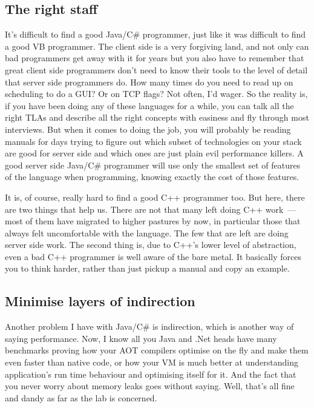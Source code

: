 \documentclass{book}
\begin{document}
\subsection{The right staff}

It's difficult to find a good Java/C\# programmer, just like it was
difficult to find a good VB programmer. The client side is a very
forgiving land, and not only can bad programmers get away with it for
years but you also have to remember that great client side programmers
don't need to know their tools to the level of detail that server side
programmers do. How many times do you need to read up on scheduling to
do a GUI? Or on TCP flags? Not often, I'd wager. So the reality is, if
you have been doing any of these languages for a while, you can talk
all the right TLAs and describe all the right concepts with easiness
and fly through most interviews. But when it comes to doing the job,
you will probably be reading manuals for days trying to figure out
which subset of technologies on your stack are good for server side
and which ones are just plain evil performance killers. A good server
side Java/C\# programmer will use only the smallest set of features of
the language when programming, knowing exactly the cost of those
features.

It is, of course, really hard to find a good C++ programmer too. But
here, there are two things that help us. There are not that many left
doing C++ work~--- most of them have migrated to higher pastures by now,
in particular those that always felt uncomfortable with the
language. The few that are left are doing server side work. The second
thing is, due to C++'s lower level of abstraction, even a bad C++
programmer is well aware of the bare metal. It basically forces you to
think harder, rather than just pickup a manual and copy an example.

\subsection{Minimise layers of indirection}

Another problem I have with Java/C\# is indirection, which is another
way of saying performance. Now, I know all you Java and .Net heads
have many benchmarks proving how your AOT compilers optimise on the
fly and make them even faster than native code, or how your VM is much
better at understanding application's run time behaviour and
optimising itself for it. And the fact that you never worry about
memory leaks goes without saying. Well, that's all fine and dandy as
far as the lab is concerned.
\end{document}
